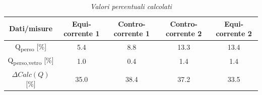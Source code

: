 \documentclass[a4paper,10pt]{article}                                                                                       %
\begin{document}
\begin{table}[H]                                                                                                            %
  \caption{\textit{Valori percentuali calcolati}}                                                                           %
  \label{tab:perc_calcs}                                                                                                    %
  \vspace{3mm}                                                                                                              %
  \centering                                                                                                                %
  \begin{tabular}{||c|c|c|c|c||}                                                                                            %
    \hline
    Dati/misure                       & Equi-corrente 1 & Contro-corrente 1 & Contro-corrente 2 & Equi-corrente 2 \\
    \hline\hline
    Q\textsubscript{perso} [\%]       & 5.4             & 8.8               & 13.3              & 13.4            \\
    Q\textsubscript{perso,vetro} [\%] & 1.0             & 0.4               & 1.4               & 1.4             \\
    $\Delta{Calc(Q)}$ [\%]            & 35.0            & 38.4              & 37.2              & 33.5            \\
    \hline
  \end{tabular}                                                                                                             %
\end{table}                                                                                                                 %
\clearpage                                                                                                                  %
\end{document}
